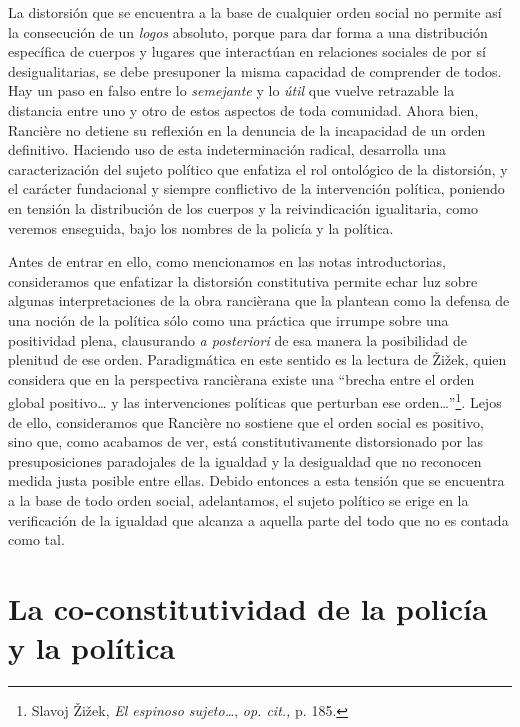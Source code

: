 La distorsión que se encuentra a la base de cualquier orden social no permite así la consecución de un \emph{logos} absoluto, porque para dar forma a una distribución específica de cuerpos y lugares que interactúan en relaciones sociales de por sí desigualitarias, se debe presuponer la misma capacidad de comprender de todos. Hay un paso en falso entre lo \emph{semejante} y lo \emph{útil} que vuelve retrazable la distancia entre uno y otro de estos aspectos de toda comunidad. Ahora bien, Rancière no detiene su reflexión en la denuncia de la incapacidad de un orden definitivo. Haciendo uso de esta indeterminación radical, desarrolla una caracterización del sujeto político que enfatiza el rol ontológico de la distorsión, y el carácter fundacional y siempre conflictivo de la intervención política, poniendo en tensión la distribución de los cuerpos y la reivindicación igualitaria, como veremos enseguida, bajo los nombres de la policía y la política.

Antes de entrar en ello, como mencionamos en las notas introductorias, consideramos que enfatizar la distorsión constitutiva permite echar luz sobre algunas interpretaciones de la obra rancièrana que la plantean como la defensa de una noción de la política sólo como una práctica que irrumpe sobre una positividad plena, clausurando \emph{a posteriori} de esa manera la posibilidad de plenitud de ese orden. Paradigmática en este sentido es la lectura de Žižek, quien considera que en la perspectiva rancièrana existe una \enquote{brecha entre el orden global positivo\ldots{} y las intervenciones políticas que perturban ese orden\ldots}\footnote{Slavoj Žižek, \emph{El espinoso sujeto\ldots{}}, \emph{op. cit.,} p. 185.}. Lejos de ello, consideramos que Rancière no sostiene que el orden social es positivo, sino que, como acabamos de ver, está constitutivamente distorsionado por las presuposiciones paradojales de la igualdad y la desigualdad que no reconocen medida justa posible entre ellas. Debido entonces a esta tensión que se encuentra a la base de todo orden social, adelantamos, el sujeto político se erige en la verificación de la igualdad que alcanza a aquella parte del todo que no es contada como tal.

\section{La co-constitutividad de la policía y la política}

